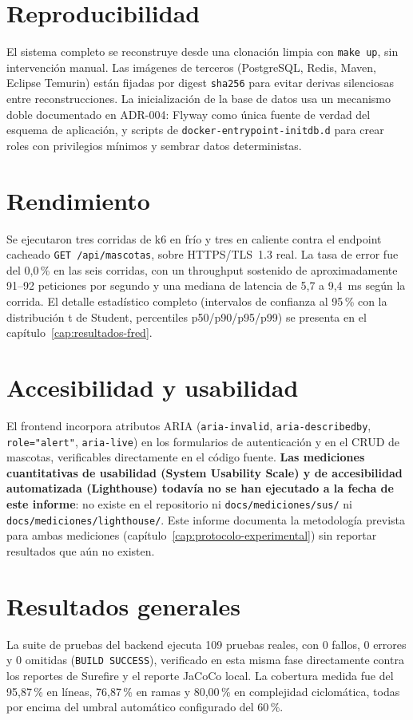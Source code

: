 \section*{Reproducibilidad}
El sistema completo se reconstruye desde una clonaci\'on limpia con
\texttt{make up}, sin intervenci\'on manual. Las im\'agenes de terceros
(PostgreSQL, Redis, Maven, Eclipse Temurin) est\'an fijadas por digest
\texttt{sha256} para evitar derivas silenciosas entre reconstrucciones. La
inicializaci\'on de la base de datos usa un mecanismo doble documentado en
ADR-004: Flyway como \'unica fuente de verdad del esquema de aplicaci\'on, y
scripts de \texttt{docker-entrypoint-initdb.d} para crear roles con
privilegios m\'inimos y sembrar datos deterministas.

\section*{Rendimiento}
Se ejecutaron tres corridas de k6 en fr\'io y tres en caliente contra el
endpoint cacheado \texttt{GET /api/mascotas}, sobre HTTPS/TLS~1.3 real. La
tasa de error fue del 0{,}0\,\% en las seis corridas, con un throughput
sostenido de aproximadamente 91--92 peticiones por segundo y una mediana de
latencia de 5{,}7 a 9{,}4~ms seg\'un la corrida. El detalle estad\'istico
completo (intervalos de confianza al 95\,\% con la distribuci\'on t de
Student, percentiles p50/p90/p95/p99) se presenta en el
cap\'itulo~\ref{cap:resultados-fred}.

\section*{Accesibilidad y usabilidad}
El frontend incorpora atributos ARIA (\texttt{aria-invalid},
\texttt{aria-describedby}, \texttt{role="alert"}, \texttt{aria-live}) en los
formularios de autenticaci\'on y en el CRUD de mascotas, verificables
directamente en el c\'odigo fuente. \textbf{Las mediciones cuantitativas de
usabilidad (System Usability Scale) y de accesibilidad automatizada
(Lighthouse) todav\'ia no se han ejecutado a la fecha de este informe}: no
existe en el repositorio ni \texttt{docs/mediciones/sus/} ni
\texttt{docs/mediciones/lighthouse/}. Este informe documenta la
metodolog\'ia prevista para ambas mediciones (cap\'itulo~\ref{cap:protocolo-experimental})
sin reportar resultados que a\'un no existen.

\section*{Resultados generales}
La suite de pruebas del backend ejecuta 109 pruebas reales, con 0 fallos, 0
errores y 0 omitidas (\texttt{BUILD SUCCESS}), verificado en esta misma
fase directamente contra los reportes de Surefire y el reporte JaCoCo
local. La cobertura medida fue del 95{,}87\,\% en l\'ineas, 76{,}87\,\% en
ramas y 80{,}00\,\% en complejidad ciclom\'atica, todas por encima del
umbral autom\'atico configurado del 60\,\%.

